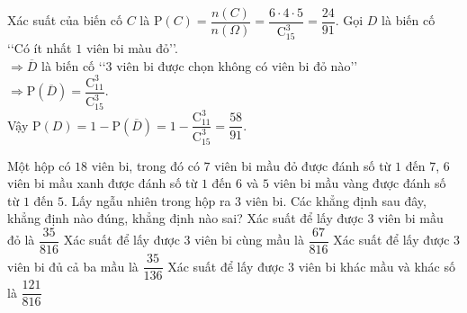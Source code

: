 \begin{ex}
{\begin{itemchoice}
   Xác suất của biến cố $C$ là $\mathrm{P}\left(C \right)=\dfrac{n\left(C \right)}{n\left(\Omega \right)}=\dfrac{6\cdot  4\cdot 5}{\mathrm{C}_{15}^3}=\dfrac{24}{91}$.
    \itemch Gọi $D$ là biến cố \lq\lq Có ít nhất $1$ viên bi màu đỏ\rq\rq.\\
    $\Rightarrow \overline{D}$ là biến cố \lq\lq $3$ viên bi được chọn không có viên bi đỏ nào\rq\rq~ $\Rightarrow \mathrm{P}\left(\overline{D} \right)=\dfrac{\mathrm{C}_{11}^3}{\mathrm{C}_{15}^3}$.\\
   Vậy  $\mathrm{P}\left(D \right)=1-\mathrm{P}\left(\overline{D} \right)=1-\dfrac{\mathrm{C}_{11}^3}{\mathrm{C}_{15}^3}=\dfrac{58}{91}$.
  \end{itemchoice}
  }
\end{ex}

\begin{ex}%
 Một hộp có $18$ viên bi, trong đó có $7$ viên bi mầu đỏ được đánh số từ $1$ đến $7$, $6$ viên bi mầu xanh được đánh số từ $1$ đến $6$ và $5$ viên bi mầu vàng được đánh số từ $1$ đến $5$. Lấy ngẫu nhiên trong hộp ra $3$ viên bi. Các khẳng định sau đây, khẳng định nào đúng, khẳng định nào  sai?
  \choiceTF
  {\True Xác suất để lấy được $3$ viên bi  mầu đỏ là $\dfrac{35}{816}$}
  {Xác suất để lấy được  $3$ viên bi cùng mầu là $\dfrac{67}{816}$}
  {\True Xác suất để lấy được $3$ viên bi đủ  cả ba mầu là $\dfrac{35}{136}$}
  {Xác suất để lấy được $3$ viên  bi khác mầu và khác số là $\dfrac{121}{816}$}
\end{ex}

